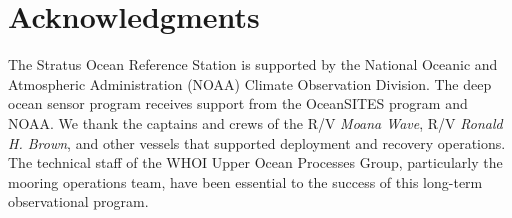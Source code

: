 \section{Acknowledgments}

The Stratus Ocean Reference Station is supported by the National Oceanic and Atmospheric Administration (NOAA) Climate Observation Division. The deep ocean sensor program receives support from the OceanSITES program and NOAA. We thank the captains and crews of the R/V \textit{Moana Wave}, R/V \textit{Ronald H. Brown}, and other vessels that supported deployment and recovery operations. The technical staff of the WHOI Upper Ocean Processes Group, particularly the mooring operations team, have been essential to the success of this long-term observational program.
